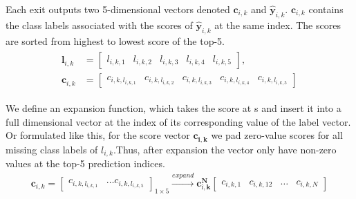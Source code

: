 Each exit outputs two 5-dimensional vectors denoted $\mathbf{c}_{i,k}$ and $ \mathbf{\hat{y}}_{i,k}  $.
$\mathbf{c}_{i,k}$ contains the class labels associated with the scores of $ \mathbf{\hat{y}}_{i,k}  $ at the same index. The scores are sorted from highest to lowest score of the top-5.
\begin{align}
\begin{split}
\mathbf{l}_{i,k} &= \begin{bmatrix}
l_{i,k,1} & l_{i,k,2} & l_{i,k,3} & l_{i,k,4} & l_{i,k,5}
\end{bmatrix}, \\
\mathbf{c}_{i,k} &= \begin{bmatrix}
c_{i,k,l_{i,k,1}} & c_{i,k,l_{i,k,2}} & c_{i,k,l_{i,k,3}} & c_{i,k,l_{i,k,4}} & c_{i,k,l_{i,k,5}}
\end{bmatrix}
\end{split}
\end{align}

We define an expansion function, which takes the score at s and insert it into a full dimensional vector at the index of its corresponding value of the label vector. Or formulated like this, for the score vector $\mathbf{c_{i,k}}$ we pad zero-value scores for all missing class labels of $ l_{i,k} $.Thus, after expansion the vector only have non-zero values at the top-5 prediction indices.
\begin{align*}
\mathbf{c}_{i,k} = 
\begin{bmatrix}
c_{i,k,l_{i,k,1}} & \dots c_{i,k,l_{i,k,5}}
\end{bmatrix}_{1 \times 5} 
\xrightarrow{expand}
\mathbf{c^{N}_{î,k}}
\begin{bmatrix}
c_{i,k,1} & c_{i,k,12} & \dots & c_{i,k,N}
\end{bmatrix} 
\end{align*}

